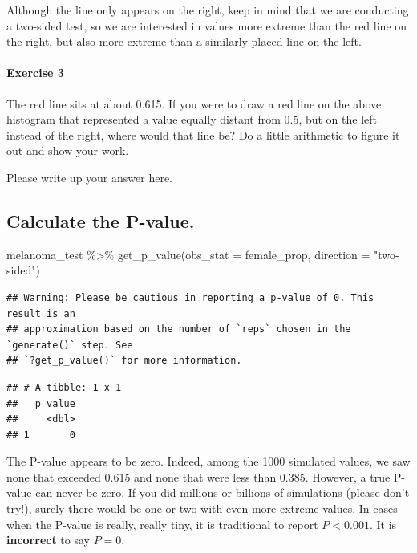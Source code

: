 \documentclass[
]{book}
\newenvironment{Shaded}{\begin{snugshade}}{\end{snugshade}}
\newcommand{\AttributeTok}[1]{\textcolor[rgb]{0.77,0.63,0.00}{#1}}
\newcommand{\FunctionTok}[1]{\textcolor[rgb]{0.00,0.00,0.00}{#1}}
\newcommand{\NormalTok}[1]{#1}
\newcommand{\SpecialCharTok}[1]{\textcolor[rgb]{0.00,0.00,0.00}{#1}}
\newcommand{\StringTok}[1]{\textcolor[rgb]{0.31,0.60,0.02}{#1}}
\begin{document}
Although the line only appears on the right, keep in mind that we are conducting a two-sided test, so we are interested in values more extreme than the red line on the right, but also more extreme than a similarly placed line on the left.

\hypertarget{exercise-3-6}{%
\paragraph*{Exercise 3}\label{exercise-3-6}}

The red line sits at about 0.615. If you were to draw a red line on the above histogram that represented a value equally distant from 0.5, but on the left instead of the right, where would that line be? Do a little arithmetic to figure it out and show your work.

Please write up your answer here.

\hypertarget{hypothesis2-ex-calculate-p}{%
\subsection{Calculate the P-value.}\label{hypothesis2-ex-calculate-p}}

\begin{Shaded}
\begin{Highlighting}[]
\NormalTok{melanoma\_test }\SpecialCharTok{\%\textgreater{}\%}
    \FunctionTok{get\_p\_value}\NormalTok{(}\AttributeTok{obs\_stat =}\NormalTok{ female\_prop, }\AttributeTok{direction =} \StringTok{"two{-}sided"}\NormalTok{)}
\end{Highlighting}
\end{Shaded}

\begin{verbatim}
## Warning: Please be cautious in reporting a p-value of 0. This result is an
## approximation based on the number of `reps` chosen in the `generate()` step. See
## `?get_p_value()` for more information.
\end{verbatim}

\begin{verbatim}
## # A tibble: 1 x 1
##   p_value
##     <dbl>
## 1       0
\end{verbatim}

The P-value appears to be zero. Indeed, among the 1000 simulated values, we saw none that exceeded 0.615 and none that were less than 0.385. However, a true P-value can never be zero. If you did millions or billions of simulations (please don't try!), surely there would be one or two with even more extreme values. In cases when the P-value is really, really tiny, it is traditional to report \(P < 0.001\). It is \textbf{incorrect} to say \(P = 0\).
\end{document}
